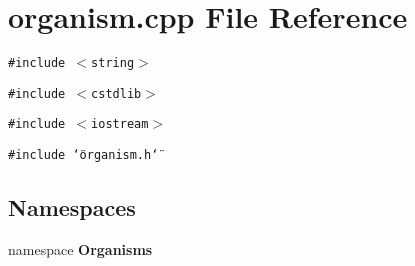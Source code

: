 \section{organism.cpp File Reference}
\label{organism_8cpp}
{\tt \#include $<$string$>$}\par
{\tt \#include $<$cstdlib$>$}\par
{\tt \#include $<$iostream$>$}\par
{\tt \#include \char`\"{}organism.h\char`\"{}}\par
\subsection*{Namespaces}
\begin{CompactItemize}
\item 
namespace \bf{Organisms}
\end{CompactItemize}
